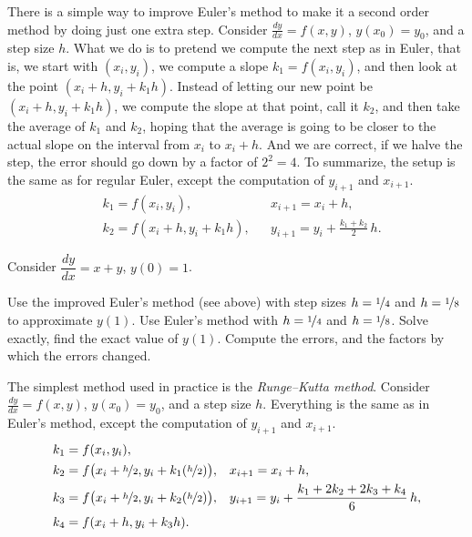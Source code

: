 \documentclass{ximera}
\begin{document}
There is a simple way to improve Euler's method to make it a second order method by doing just one extra step. Consider $\frac{dy}{dx}=f(x,y)$, $y(x_0) = y_0$, and a step size $h$. What we do is to pretend we compute the next step as in Euler, that is, we start with $(x_i,y_i)$, we compute a slope $k_1 = f(x_i,y_i)$, and then look at the point $(x_i+h,y_i + k_1h)$. Instead of letting our new point be $(x_i+h,y_i + k_1h)$, we compute the slope at that point, call it $k_2$, and then take the average of $k_1$ and $k_2$, hoping that the average is going to be closer to the actual slope on the interval from $x_i$ to $x_i+h$.  And we are correct, if we halve the step, the error should go down by a factor of $2^2 = 4$. To summarize, the setup is the same as for regular Euler, except the computation of $y_{i+1}$ and $x_{i+1}$.
\begin{align*}
    & k_1 = f(x_i,y_i) , & & 
    x_{i+1} = x_i + h , \\
    & k_2 = f(x_i + h,y_i + k_1h) ,
    & & y_{i+1} = y_i + \frac{k_1+k_2}{2}\,h .
\end{align*}


\begin{exercise}%
    Consider $\dfrac{dy}{dx} = x+y$, $y(0)=1$.
    \begin{tasks}
        \task Use the improved Euler's method (see above) with step sizes $h=\nicefrac{1}{4}$ and $h=\nicefrac{1}{8}$ to approximate $y(1)$.
        \task Use Euler's method with $h=\nicefrac{1}{4}$ and $h=\nicefrac{1}{8}$.
        \task Solve exactly, find the exact value of $y(1)$.
        \task Compute the errors, and the factors by which the errors changed.
    \end{tasks}
\end{exercise}


The simplest method used in practice is the \emph{Runge--Kutta method}. Consider $\frac{dy}{dx}=f(x,y)$, $y(x_0) = y_0$, and a step size $h$.  Everything is the same as in Euler's method, except the computation of $y_{i+1}$ and $x_{i+1}$.
\begin{align*}
    & k_1 = f(x_i,y_i) , & & \\
    & k_2 = f\bigl(x_i + \nicefrac{h}{2},y_i + k_1 (\nicefrac{h}{2})\bigr) ,
    & & 
    x_{i+1} = x_i + h , \\
    & k_3 = f\bigl(x_i + \nicefrac{h}{2},y_i + k_2 (\nicefrac{h}{2})\bigr) ,
    & &
    y_{i+1} = y_i + \frac{k_1 + 2k_2 + 2k_3 + k_4}{6}\,h ,  \\
    & k_4 = f(x_i + h,y_i + k_3 h) .
\end{align*}
\end{document}
